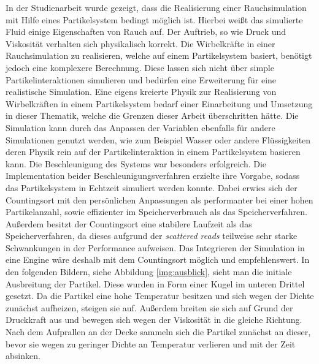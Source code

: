 \documentclass[intern,palatino]{cgBA}
\begin{document}
In der Studienarbeit wurde gezeigt, dass die Realisierung einer Rauchsimulation mit Hilfe eines Partikelsystem bedingt möglich ist. Hierbei weißt das simulierte Fluid einige Eigenschaften von Rauch auf. Der Auftrieb, so wie Druck und Viskosität verhalten sich physikalisch korrekt. Die Wirbelkräfte in einer Rauchsimulation zu realisieren, welche auf einem Partikelsystem basiert, benötigt jedoch eine komplexere Berechnung. Diese lassen sich nicht über simple Partikelinteraktionen simulieren und bedürfen eine Erweiterung für eine realistische Simulation. Eine eigens kreierte Physik zur Realisierung von Wirbelkräften in einem Partikelsystem bedarf einer Einarbeitung und Umsetzung in dieser Thematik, welche die Grenzen dieser Arbeit überschritten hätte.
\newline
Die Simulation kann durch das Anpassen der Variablen ebenfalls für andere Simulationen genutzt werden, wie zum Beispiel Wasser oder andere Flüssigkeiten deren Physik rein auf der Partikelinteraktion in einem Partikelsystem basieren kann.
\newline
Die Beschleunigung des Systems war besonders erfolgreich. Die Implementation beider Beschleunigungsverfahren erzielte ihre Vorgabe, sodass das Partikelsystem in Echtzeit simuliert werden konnte. Dabei erwies sich der Countingsort mit den persönlichen Anpassungen als performanter bei einer hohen Partikelanzahl, sowie effizienter im Speicherverbrauch als das Speicherverfahren. Außerdem besitzt der Countingsort eine stabilere Laufzeit als das Speicherverfahren, da dieses aufgrund der \textit{scattered reads} teilweise sehr starke Schwankungen in der Performance aufweisen. 
\newline
Das Integrieren der Simulation in eine Engine  wäre deshalb mit dem Countingsort möglich und empfehlenswert.
\newline
In den folgenden Bildern, siehe Abbildung \ref{img:ausblick}, sieht man die initiale Ausbreitung der Partikel. Diese wurden in Form einer Kugel im unteren Drittel gesetzt. Da die Partikel eine hohe Temperatur besitzen und sich wegen der Dichte zunächst aufheizen, steigen sie auf. Außerdem breiten sie sich auf Grund der Druckkraft aus und bewegen sich wegen der Viskosität in die gleiche Richtung. Nach dem Aufprallen an der Decke sammeln sich die Partikel zunächst an dieser, bevor sie wegen zu geringer Dichte an Temperatur verlieren und mit der Zeit absinken.
\end{document}
